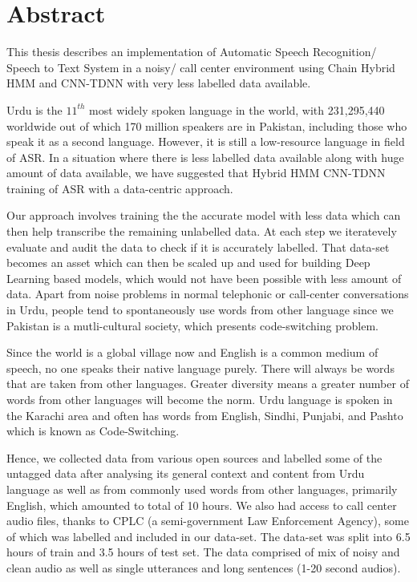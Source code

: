     \newpage
    \chapter*{Abstract}

This thesis describes an implementation of Automatic Speech Recognition/ Speech to Text System in a noisy/ call center environment using Chain Hybrid HMM and CNN-TDNN with very less labelled data available. 
 
Urdu is the $11^{th}$ most widely spoken language in the world, with 231,295,440 worldwide out of which 170 million speakers are in Pakistan, including those who speak it as a second language. However, it is still a low-resource language in field of ASR. In a situation where there is less labelled data available along with huge amount of data available, we have suggested that Hybrid HMM CNN-TDNN training of ASR with a data-centric approach. 
 
Our approach involves training the the accurate model with less data which can then help transcribe the remaining unlabelled data. At each step we iteratevely evaluate and audit the data to check if it is accurately labelled. That data-set becomes an asset which can then be scaled up and used for building Deep Learning based models, which would not have been possible with less amount of data. Apart from noise problems in normal telephonic or call-center conversations in Urdu, people tend to spontaneously use words from other language since we Pakistan is a mutli-cultural society, which presents code-switching problem. 
 
Since the world is a global village now and English is a common medium of speech, no one speaks their native language purely. There will always be words that are taken from other languages. Greater diversity means a greater number of words from other languages will become the norm. Urdu language is spoken in the Karachi area and often has words from English, Sindhi, Punjabi, and Pashto which is known as Code-Switching.
 
Hence, we collected data from various open sources and labelled some of the untagged data after analysing its general context and content from Urdu language as well as from commonly used words from other languages, primarily English, which amounted to total of 10 hours. We also had access to call center audio files, thanks to CPLC \cite{cplc_cplc_nodate} (a semi-government Law Enforcement Agency), some of which was labelled and included in our data-set. The data-set was split into 6.5 hours of train and 3.5 hours of test set. The data comprised of mix of noisy and clean audio as well as single utterances and long sentences (1-20 second audios). 
 
